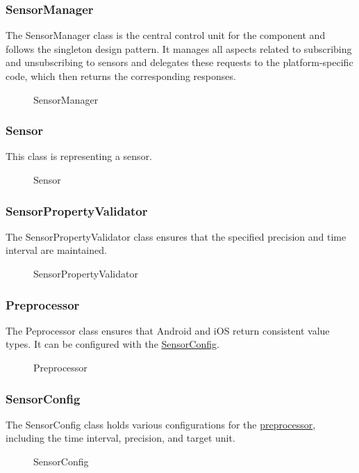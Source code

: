 \documentclass[12pt]{article}
\begin{document}
\subsubsection{SensorManager}
\label{sec:SensorManager}
The SensorManager class is the central control unit for the component and follows the singleton design pattern. It manages all aspects related to subscribing and unsubscribing to sensors and delegates these requests to the platform-specific code, which then returns the corresponding responses.
\begin{figure}[ht]
\centering

\caption{\label{fig:bild21} SensorManager}
\end{figure}

\subsubsection{Sensor}
\label{sec:Sensor}
This class is representing a sensor.
\begin{figure}[ht]
\centering

\caption{\label{fig:bild22} Sensor}
\end{figure}
\newpage

\subsubsection{SensorPropertyValidator}
\label{sec:SensorPropertyValidator}
The SensorPropertyValidator class ensures that the specified precision and time interval are maintained.
\begin{figure}[ht]
\centering

\caption{\label{fig:bild23} SensorPropertyValidator}
\end{figure}


\subsubsection{Preprocessor}
\label{sec:Preprocessor}
The Peprocessor class ensures that Android and iOS return consistent value types. It can be configured with the \hyperref[sec:SensorConfig]{SensorConfig}.
\begin{figure}[ht]
\centering

\caption{\label{fig:bild24} Preprocessor}
\end{figure}
\newpage
\subsubsection{SensorConfig}
\label{sec:SensorConfig}
The SensorConfig class holds various configurations for the \hyperref[sec:Preprocessor]{preprocessor}, including the time interval, precision, and target unit.
\begin{figure}[ht]
\centering

\caption{\label{fig:bild25} SensorConfig}
\end{figure}
\end{document}
